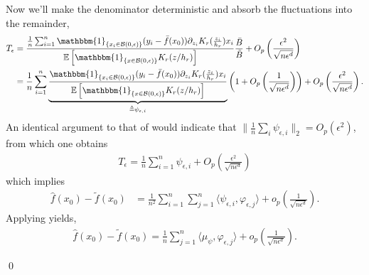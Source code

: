 \documentclass[11pt]{article}
\begin{document}
Now we'll make the denominator deterministic and absorb the fluctuations into the remainder,
\begin{align*}
    T_{\epsilon} &= \frac{\frac{1}{n}\sum_{i = 1}^n\mathbbm{1}_{\{x_i \in \mathcal{B}(0, \epsilon)\}}(y_i - \bar{f}(x_0))\partial_{z_i}K_r(\frac{z_i}{h_r})x_i}{\mathbb{E}\left[\mathbbm{1}_{\{x \in \mathcal{B}(0, \epsilon)\}}K_r(z/h_r)\right]}\frac{\bar{B}}{\tilde{B}} + O_p\left(\frac{\epsilon^2}{\sqrt{n\epsilon^d}}\right) \\
    &= \frac{1}{n}\sum_{i = 1}^n\underbrace{\frac{\mathbbm{1}_{\{x_i \in \mathcal{B}(0, \epsilon)\}}(y_i - \bar{f}(x_0))\partial_{z_i}K_r(\frac{z_i}{h_r})x_i}{\mathbb{E}\left[\mathbbm{1}_{\{x \in \mathcal{B}(0, \epsilon)\}}K_r(z/h_r)\right]}}_{\triangleq \psi_{\epsilon, i}}\left(1 + O_p\left(\frac{1}{\sqrt{n\epsilon^d}}\right)\right) + O_p\left(\frac{\epsilon^2}{\sqrt{n\epsilon^d}}\right).
\end{align*}
An identical argument to that of  would indicate that $\|\frac{1}{n}\sum_i\psi_{\epsilon, i}\|_2 = O_p(\epsilon^2)$, from which one obtains
\begin{align*}
    T_{\epsilon} = \frac{1}{n}\sum_{i = 1}^n\psi_{\epsilon, i} + O_p\left(\frac{\epsilon^2}{\sqrt{n\epsilon^d}}\right)
\end{align*}
which implies
\begin{align*}
    \hat{f}(x_0) - \tilde{f}(x_0) &= \frac{1}{n^2}\sum_{i = 1}^n\sum_{j = 1}^n\langle \psi_{\epsilon, i}, \varphi_{\epsilon,j }\rangle + o_p\left(\frac{1}{\sqrt{n\epsilon^{d}}} \right).
\end{align*}
Applying  yields,
\begin{align*}
    \hat{f}(x_0) - \tilde{f}(x_0) = \frac{1}{n}\sum_{j = 1}^n\langle\mu_{\psi}, \varphi_{\epsilon, j}\rangle + o_p\left(\frac{1}{\sqrt{n\epsilon^d}}\right).
\end{align*}

\qed{}
\end{document}
